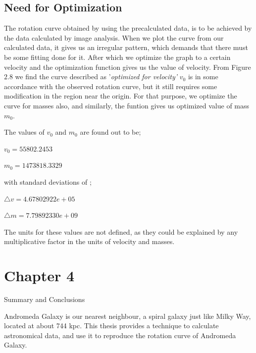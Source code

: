 \subsection{Need for Optimization}

The rotation curve obtained by using the precalculated data, is to be achieved by the data calculated by image analysis. When we plot the curve from our calculated data, it gives us an irregular pattern, which demands that there must be some fitting done for it. After which we optimize the graph to a certain velocity and the optimization function gives us the value of velocity. From Figure $2.8$ we find the curve described as '\textit{optimized for velocity'} \textbf{$v_{0}$} is in some accordance with the observed rotation curve, but it still requires some modification in the region near the origin. For that purpose, we optimize the curve for masses also, and similarly, the funtion gives us optimized value of mass \textbf{$m_{0}$}. 

The values of $v_{0}$ and $m_{0}$ are found out to be;

$v_{0} = 55802.2453 $         

$m_{0} = 1473818.3329 $

with standard deviations of ;

$\triangle v =  4.67802922e+05$

$\triangle m = 7.79892330e+09 $

The units for these values are not defined, as they could be explained by any multiplicative factor in the units of velocity and masses. 

\section{Chapter 4} 


Summary and Conclusions

Andromeda Galaxy is our nearest neighbour, a spiral galaxy just like Milky Way, located at about 744 kpc. This thesis provides a technique to calculate astronomical data, and use it to reproduce the rotation curve of Andromeda Galaxy. 







